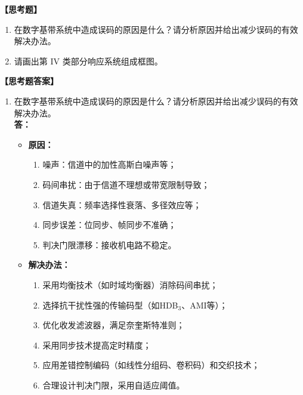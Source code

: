 \documentclass[a4paper,11pt]{ctexart}
\begin{document}
\vspace{4em}
    

\noindent \textbf{【思考题】}

\begin{enumerate}
    \item 在数字基带系统中造成误码的原因是什么？请分析原因并给出减少误码的有效解决办法。
    \item 请画出第 IV 类部分响应系统组成框图。
\end{enumerate}

\vspace{2em}

\noindent \textbf{【思考题答案】}

\begin{enumerate}
    \item 在数字基带系统中造成误码的原因是什么？请分析原因并给出减少误码的有效解决办法。\\
    \textbf{答：} 
    \begin{itemize}
        \item \textbf{原因：} 
            \begin{enumerate}
                \item 噪声：信道中的加性高斯白噪声等；
                \item 码间串扰：由于信道不理想或带宽限制导致；
                \item 信道失真：频率选择性衰落、多径效应等；
                \item 同步误差：位同步、帧同步不准确；
                \item 判决门限漂移：接收机电路不稳定。
            \end{enumerate}
        \item \textbf{解决办法：}
            \begin{enumerate}
                \item 采用均衡技术（如时域均衡器）消除码间串扰；
                \item 选择抗干扰性强的传输码型（如HDB$_3$、AMI等）；
                \item 优化收发滤波器，满足奈奎斯特准则；
                \item 采用同步技术提高定时精度；
                \item 应用差错控制编码（如线性分组码、卷积码）和交织技术；
                \item 合理设计判决门限，采用自适应阈值。
            \end{enumerate}
    \end{itemize}


\end{enumerate}
\end{document}
